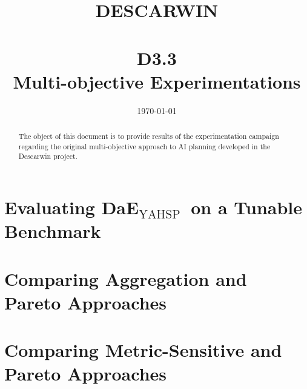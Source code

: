 \documentclass[english]{DESCARWINreport}
\title{DESCARWIN\\\bigskip {\em \LARGE The Marriage of Descartes and Darwin}\\\vspace{8cm} 
{\LARGE D3.3\\
Multi-objective Experimentations}}
\date{\today}
\newcounter{con}
\begin{document}
\maketitle


\begin{revisions}
\begin{revtable}
\end{revtable}
\begin{revisionlabels}
\revlabel{}
\end{revisionlabels}
\end{revisions}


\begin{abstract}
The object of this document is to provide results of the experimentation campaign regarding the original multi-objective approach to AI planning developed in the Descarwin project.
\end{abstract}


\tableofcontents

\newpage

\newcommand{\DAEYAHSP}{{\sc DaE$_{\text{YAHSP}}$}}
\chapter{Evaluating \DAEYAHSP\ on a Tunable Benchmark}

\newpage
\hoffset 0cm

\newpage
\hoffset -2cm

\chapter{Comparing Aggregation and Pareto Approaches}

\newpage
\hoffset 0cm

\newpage
\hoffset -2cm

\chapter{Comparing Metric-Sensitive and Pareto Approaches}

\newpage
\hoffset 0cm

\hoffset -2cm
\end{document}
